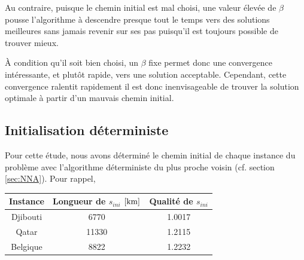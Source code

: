 \documentclass[a4paper, 12pt]{report}
\begin{document}
    Au contraire, puisque le chemin initial est mal choisi, une valeur élevée de $\beta$ pousse l'algorithme à \og{}descendre\fg{} presque tout le temps vers des solutions meilleures sans jamais revenir sur ses pas puisqu'il est toujours possible de trouver mieux. \par
    À condition qu'il soit bien choisi, un $\beta$ fixe permet donc une convergence intéressante, et plutôt rapide, vers une solution acceptable. Cependant, cette convergence ralentit rapidement il est donc inenvisageable de trouver la solution optimale à partir d'un mauvais chemin initial.
    \subsection{Initialisation déterministe}
    Pour cette étude, nous avons déterminé le chemin initial de chaque instance du problème avec l'algorithme déterministe du plus proche voisin (cf. section \ref{sec:NNA}). Pour rappel,
    \begin{table}[H]
    	\centering
    	\begin{tabular}{|c|c|c|}
    		\hline
    		Instance & Longueur de $s_{ini}$ $\left[\si{\kilo\meter}\right]$ & Qualité de $s_{ini}$ \\ \hline
    		\hline
    		Djibouti & \num{6770} & \num{1.0017}\\ \hline
    		Qatar & \num{11330} & \num{1.2115}\\ \hline
    		Belgique & \num{8822} & \num{1.2232}\\ \hline
    	\end{tabular}
    	\label{tab:q5_2}
    \end{table}
\end{document}
